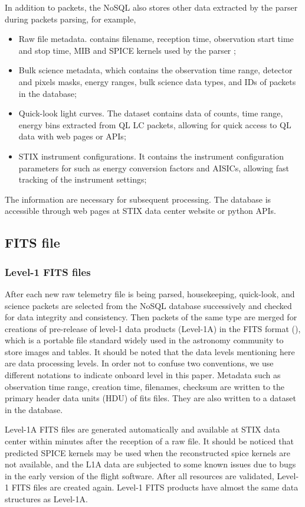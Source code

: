 \documentclass[referee]{aa} %
\begin{document}
In addition to packets, the NoSQL also stores other data extracted by the parser during packets parsing, 
for example, 
\begin{itemize}
  \item Raw file metadata. contains filename, reception time, observation start time and stop time, MIB and SPICE kernels used by the parser ; 
  \item Bulk science metadata, which contains the observation time range, detector and pixels masks, energy ranges, 
   bulk science data types, and IDs of packets in the database; 
  \item Quick-look light curves.  The dataset contains data of counts, time range, energy bins extracted from QL LC packets, 
     allowing for  quick access to QL data with web pages or APIs;
  \item STIX instrument configurations. 
  It contains the instrument configuration parameters for such as  energy conversion factors and AISICs, 
  allowing fast tracking of the instrument settings;
\end{itemize}
The information are necessary for subsequent processing. The
database is  accessible through web pages at STIX data center website or python APIs. 
\subsection{FITS file}
\subsubsection{Level-1 FITS files}
After each new raw telemetry file is being parsed, 
housekeeping, quick-look, and science packets  
are selected from the NoSQL database successively 
and checked for data integrity and consistency. 
Then packets of the same type are merged for creations of pre-release of 
level-1 data products (Level-1A)
 in the FITS format (\cite{fits}), 
which is a portable file standard widely used in the astronomy 
community to store images and tables.
It should be noted that the data levels mentioning here are data processing levels. 
In order not to confuse two conventions, we use different notations to indicate onboard level in this paper. 
Metadata such as observation time range, creation time, filenames,  checksum are written to 
the primary header data units (HDU) of fits files. 
They are also written to a dataset in the database.

Level-1A FITS files are generated automatically and available at STIX data center within minutes 
after the reception of a raw file.
It should be noticed that predicted SPICE kernels may be used when the reconstructed spice kernels  
are not available, and the L1A data are subjected to some known issues 
due to bugs in the early version of the flight software.
After all resources are validated,  Level-1  FITS files are created again. 
Level-1  FITS products have almost the same data structures as Level-1A.
\end{document}
